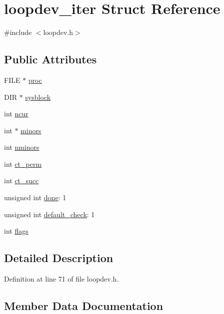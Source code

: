 \hypertarget{structloopdev__iter}{}\section{loopdev\+\_\+iter Struct Reference}
\label{structloopdev__iter}


{\ttfamily \#include $<$loopdev.\+h$>$}

\subsection*{Public Attributes}
\begin{DoxyCompactItemize}
\item 
F\+I\+LE $\ast$ \hyperlink{structloopdev__iter_a06689bbed3fbd0801ed4616e4638bb22}{proc}
\item 
D\+IR $\ast$ \hyperlink{structloopdev__iter_a30c2d65ed9d5100bb23f5af7748b06c1}{sysblock}
\item 
int \hyperlink{structloopdev__iter_a14810524b70941ce3bad79db53fde61f}{ncur}
\item 
int $\ast$ \hyperlink{structloopdev__iter_a5509c13b186f948577e6dea7e00de895}{minors}
\item 
int \hyperlink{structloopdev__iter_a6f06ef0cd62a2122e457c42732dd0827}{nminors}
\item 
int \hyperlink{structloopdev__iter_a7b72479f758892e4184b1222b98f5626}{ct\+\_\+perm}
\item 
int \hyperlink{structloopdev__iter_a53278ff8ff4caf72a03782110ca57c99}{ct\+\_\+succ}
\item 
unsigned int \hyperlink{structloopdev__iter_aa25ce39afbcf425be7d101066da48eff}{done}\+: 1
\item 
unsigned int \hyperlink{structloopdev__iter_a2c9c706807febcc561da3ba918cb3c49}{default\+\_\+check}\+: 1
\item 
int \hyperlink{structloopdev__iter_a31107edca19b29cd996f344a42dd7cfa}{flags}
\end{DoxyCompactItemize}


\subsection{Detailed Description}


Definition at line 71 of file loopdev.\+h.



\subsection{Member Data Documentation}
\mbox{\label{structloopdev__iter_a7b72479f758892e4184b1222b98f5626}} 
